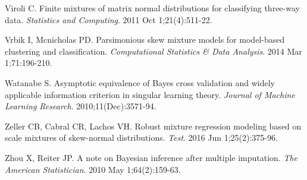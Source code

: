 \documentclass[useAMS,referee]{biom}
\begin{document}
\begin{thebibliography}{}
\bibitem{ } Viroli C. Finite mixtures of matrix normal distributions for classifying three-way data. \textit{Statistics and Computing}. 2011 Oct 1;21(4):511-22.

\bibitem{ } Vrbik I, Mcnicholas PD. Parsimonious skew mixture models for model-based clustering and classification. \textit{Computational Statistics \& Data Analysis}. 2014 Mar 1;71:196-210.

\bibitem{ } Watanabe S. Asymptotic equivalence of Bayes cross validation and widely applicable information criterion in singular learning theory. \textit{Journal of Machine Learning Research}. 2010;11(Dec):3571-94.

\bibitem{ } Zeller CB, Cabral CR, Lachos VH. Robust mixture regression modeling based on scale mixtures of skew-normal distributions. \textit{Test}. 2016 Jun 1;25(2):375-96.

\bibitem{ } Zhou X, Reiter JP. A note on Bayesian inference after multiple imputation. \textit{The American Statistician}. 2010 May 1;64(2):159-63.

\end{thebibliography}




\label{lastpage}
\end{document}
